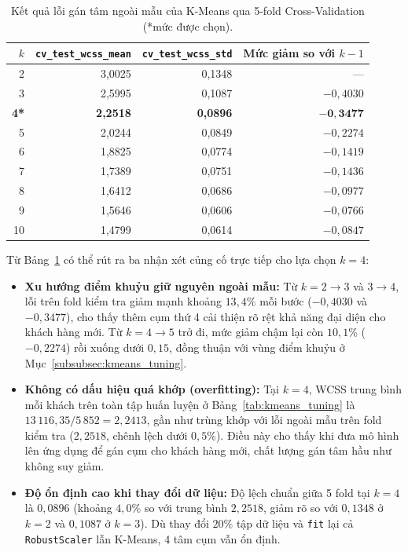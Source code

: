 \documentclass[12pt,a4paper]{article}
\numberwithin{equation}{section}
\numberwithin{table}{section}
\numberwithin{figure}{section}
\begin{document}
\begin{table}[H]
\centering
\small
\begin{tabular}{@{}rrrr@{}}
\toprule
\textbf{$k$} & \textbf{\texttt{cv\_test\_wcss\_mean}} & \textbf{\texttt{cv\_test\_wcss\_std}} & \textbf{Mức giảm so với $k-1$} \\
\midrule
2  & 3,0025 & 0,1348 & --- \\
3  & 2,5995 & 0,1087 & $-0,4030$ \\
\textbf{4*} & \textbf{2,2518} & \textbf{0,0896} & $\mathbf{-0,3477}$ \\
5  & 2,0244 & 0,0849 & $-0,2274$ \\
6  & 1,8825 & 0,0774 & $-0,1419$ \\
7  & 1,7389 & 0,0751 & $-0,1436$ \\
8  & 1,6412 & 0,0686 & $-0,0977$ \\
9  & 1,5646 & 0,0606 & $-0,0766$ \\
10 & 1,4799 & 0,0614 & $-0,0847$ \\
\bottomrule
\end{tabular}
\caption{Kết quả lỗi gán tâm ngoài mẫu của K-Means qua 5-fold Cross-Validation (*mức được chọn).}
\label{tab:kmeans_cv}
\end{table}

Từ Bảng~\ref{tab:kmeans_cv} có thể rút ra ba nhận xét củng cố trực tiếp cho lựa chọn $k = 4$:
\begin{itemize}[leftmargin=1.5em]
    \item \textbf{Xu hướng điểm khuỷu giữ nguyên ngoài mẫu:} Từ $k = 2 \to 3$ và $3 \to 4$, lỗi trên fold kiểm tra giảm mạnh khoảng $13,4\%$ mỗi bước ($-0,4030$ và $-0,3477$), cho thấy thêm cụm thứ 4 cải thiện rõ rệt khả năng đại diện cho khách hàng mới. Từ $k = 4 \to 5$ trở đi, mức giảm chậm lại còn $10,1\%$ ($-0,2274$) rồi xuống dưới $0,15$, đồng thuận với vùng điểm khuỷu ở Mục~\ref{subsubsec:kmeans_tuning}.
    \item \textbf{Không có dấu hiệu quá khớp (overfitting):} Tại $k = 4$, WCSS trung bình mỗi khách trên toàn tập huấn luyện ở Bảng~\ref{tab:kmeans_tuning} là $13\,116,35 / 5\,852 = 2,2413$, gần như trùng khớp với lỗi ngoài mẫu trên fold kiểm tra ($2,2518$, chênh lệch dưới $0,5\%$). Điều này cho thấy khi đưa mô hình lên ứng dụng để gán cụm cho khách hàng mới, chất lượng gán tâm hầu như không suy giảm.
    \item \textbf{Độ ổn định cao khi thay đổi dữ liệu:} Độ lệch chuẩn giữa 5 fold tại $k = 4$ là $0,0896$ (khoảng $4,0\%$ so với trung bình $2,2518$, giảm rõ so với $0,1348$ ở $k=2$ và $0,1087$ ở $k=3$). Dù thay đổi $20\%$ tập dữ liệu và \texttt{fit} lại cả \texttt{RobustScaler} lẫn K-Means, 4 tâm cụm vẫn ổn định.
\end{itemize}
\end{document}
